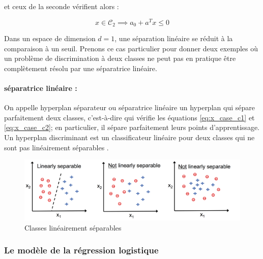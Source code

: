 	et ceux de la seconde vérifient alors :
	
	\begin{equation}\label{eq:x_case_c2}
	x \in \mathcal{C}_2 \implies a_0 + a^Tx \leq 0
	\end{equation}
	
	
	Dans un espace de dimension $d = 1$, une séparation linéaire se réduit à la comparaison à un seuil. Prenons ce cas particulier pour donner deux exemples où un problème de discrimination à deux classes ne peut pas en pratique être complètement résolu par une séparatrice linéaire.
	
	\paragraph* {séparatrice linéaire :}On appelle hyperplan séparateur ou séparatrice linéaire un hyperplan qui sépare parfaitement deux classes, c'est-à-dire qui vérifie les équations \ref{eq:x_case_c1} et \ref{eq:x_case_c2}; en particulier, il sépare parfaitement leurs points d'apprentissage. Un hyperplan discriminant est un classificateur linéaire pour deux classes qui ne sont pas linéairement séparables \cite{antoine2018apprentissage}.
	
	\begin{figure}[H]%
		\centering
		\includegraphics[width=\textwidth]{images/linearly_separable.png}
		\caption[Classes linéairement séparables.]{Classes linéairement séparables \cite{ml2008python}}
		\label{fig:linearly_separable}
	\end{figure}
	
	
	
	\subsubsection{Le modèle de la régression logistique} \label{subsec:reg_logistique}
	
